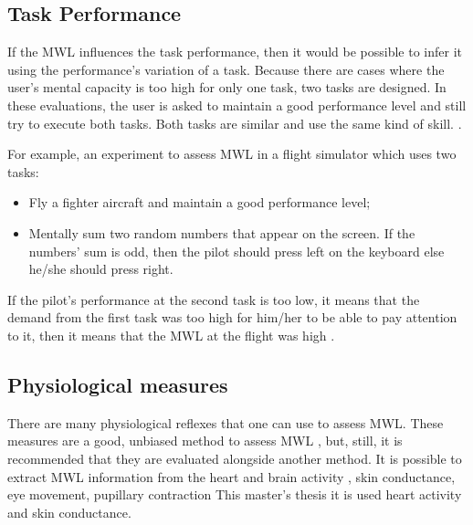        
    
    \subsection{Task Performance}
    \label{subsec:task_performance}
    
        If the MWL influences the task performance, then it would be possible to infer it using the performance's variation of a task. Because there are cases where the user's mental capacity is too high for only one task, two tasks are designed. In these evaluations, the user is asked to maintain a good performance level and still try to execute both tasks. Both tasks are similar and use the same kind of skill. \cite{stanton2004handbook, sanders1998human}.
        
        For example, an experiment to assess MWL in a flight simulator which uses two tasks:
        \begin{itemize}
            \item Fly a fighter aircraft and maintain a good performance level;
            \item Mentally sum two random numbers that appear on the screen. If the numbers' sum is odd, then the pilot should press left on the keyboard else he/she should press right.
        \end{itemize} 
    
        If the pilot's performance at the second task is too low, it means that the demand from the first task was too high for him/her to be able to pay attention to it, then it means that the MWL at the flight was high \cite{mohanavelu2020cognitive}.
        
    \subsection{Physiological measures}
    \label{subsec:physiological_measures}
    
        There are many physiological reflexes that one can use to assess MWL. These measures are a good, unbiased method to assess MWL \cite{fallahi2016effects}, but, still, it is recommended that they are evaluated alongside another method. It is possible to extract MWL information from the heart and brain activity \cite{chakladar2020eeg, orlandi2018measuring}, skin conductance, eye movement, pupillary contraction \cite{stanton2004handbook, rodriguez2015pupillometry} This master's thesis it is used heart activity and skin conductance.
        
